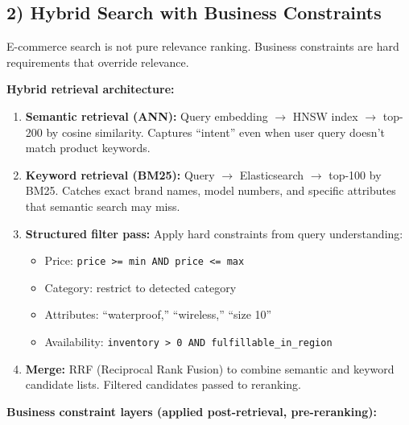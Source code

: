 \subsection*{2) Hybrid Search with Business Constraints}

E-commerce search is not pure relevance ranking. Business constraints are hard requirements that override relevance.

\textbf{Hybrid retrieval architecture:}

\begin{enumerate}
  \item \textbf{Semantic retrieval (ANN):} Query embedding $\rightarrow$ HNSW index $\rightarrow$ top-200 by cosine similarity. Captures ``intent'' even when user query doesn't match product keywords.
  \item \textbf{Keyword retrieval (BM25):} Query $\rightarrow$ Elasticsearch $\rightarrow$ top-100 by BM25. Catches exact brand names, model numbers, and specific attributes that semantic search may miss.
  \item \textbf{Structured filter pass:} Apply hard constraints from query understanding:
    \begin{itemize}
      \item Price: \texttt{price >= min AND price <= max}
      \item Category: restrict to detected category
      \item Attributes: ``waterproof,'' ``wireless,'' ``size 10''
      \item Availability: \texttt{inventory > 0 AND fulfillable\_in\_region}
    \end{itemize}
  \item \textbf{Merge:} RRF (Reciprocal Rank Fusion) to combine semantic and keyword candidate lists. Filtered candidates passed to reranking.
\end{enumerate}

\textbf{Business constraint layers (applied post-retrieval, pre-reranking):}

